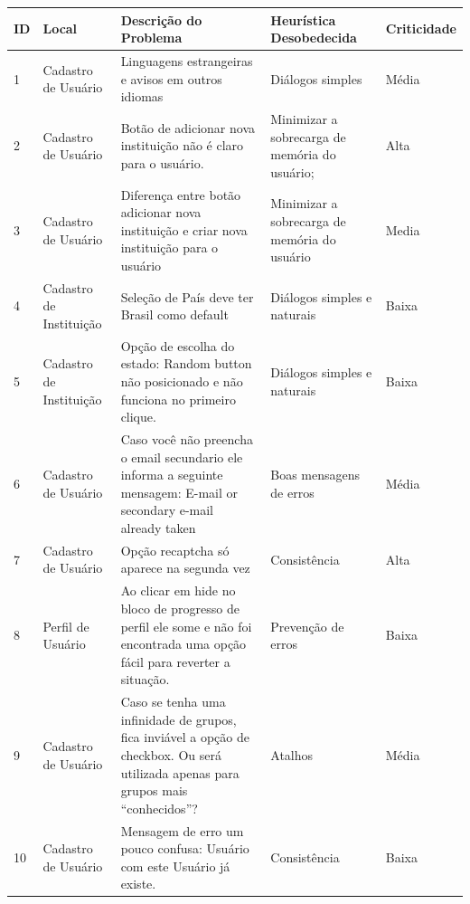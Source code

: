 \begin{table}[d]
\begin{tabular}{|l|p{3cm}|p{6cm}|p{3cm}|l|}
\hline
\textbf{ID} & \textbf{Local} & \textbf{Descrição do Problema}                                                                                     & \textbf{Heurística Desobedecida} & \textbf{Criticidade} \\ \hline
1           & Cadastro de Usuário                 & Linguagens estrangeiras e avisos em outros idiomas & Diálogos simples  & Média                \\ \hline
2           & Cadastro de Usuário      & Botão de adicionar nova instituição não é claro para o usuário.  & Minimizar a sobrecarga de memória do usuário;           & Alta                \\ \hline
3           & Cadastro de Usuário               & Diferença entre botão adicionar nova instituição e criar nova instituição para o usuário  & Minimizar a sobrecarga de memória do usuário & Media                \\ \hline
4           & Cadastro de Instituição             & Seleção de País deve ter Brasil como default  & Diálogos simples e naturais    & Baixa                \\ \hline
5           & Cadastro de Instituição      & Opção de escolha do estado: Random button não posicionado e não funciona no primeiro clique. & Diálogos simples e naturais  & Baixa                \\ \hline
6           & Cadastro de Usuário  & Caso você não preencha o email secundario ele informa a seguinte mensagem: E-mail or secondary e-mail already taken & Boas mensagens de erros                & Média                \\ \hline
7           & Cadastro de Usuário  & Opção recaptcha só aparece na segunda vez & Consistência                     & Alta                \\ \hline
8           & Perfil de Usuário  & Ao clicar em hide no bloco de progresso de perfil ele some e não foi encontrada uma opção fácil para reverter a situação.
 & Prevenção de erros                     & Baixa                \\ \hline
9           & Cadastro de Usuário  & Caso se tenha uma infinidade de grupos, fica inviável a opção de checkbox. Ou será utilizada apenas para grupos mais ``conhecidos''? & Atalhos & Média                \\ \hline
10           & Cadastro de Usuário  & Mensagem de erro um pouco confusa: Usuário com este Usuário já existe.  & Consistência                     & Baixa                \\ \hline
\end{tabular}
\end{table}



